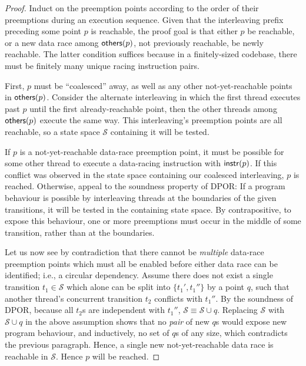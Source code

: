 \begin{proof}
Induct on the preemption points according to the order of their preemptions during an execution sequence.
Given that the interleaving prefix preceding some point $p$ is reachable,
the proof goal is that either $p$ be reachable,
or a new data race among $\mathsf{others}(p)$, not previously reachable, be newly reachable.
The latter condition suffices because in a finitely-sized codebase,
there must be finitely many unique racing instruction pairs.

First, $p$ must be ``coalesced'' away, as well as any other not-yet-reachable points in $\mathsf{others}(p)$.
Consider the alternate interleaving in which the first thread executes past $p$ until the first already-reachable point,
then the other threads among $\mathsf{others}(p)$ execute the same way.
This interleaving's preemption points are all reachable,
so a state space $\mathcal{S}$ containing it will be tested.

If $p$ is a not-yet-reachable data-race preemption point,
it must be possible for some other thread to execute a data-racing instruction with $\mathsf{instr}(p)$.
If this conflict was observed in the state space containing our coalesced interleaving, $p$ is reached.
Otherwise, appeal to the soundness property of DPOR:
If a program behaviour is possible by interleaving threads at the boundaries of the given transitions,
it will be tested in the containing state space.
By contrapositive, to expose this behaviour,
one or more preemptions must occur in the middle of some transition, rather than at the boundaries.

Let us now see by contradiction that there cannot be {\em multiple} data-race preemption points
which must all be enabled before either data race can be identified;
i.e., a circular dependency.
Assume there does not exist a single transition $t_1 \in \mathcal{S}$
which alone can be split into $\{t_1',t_1''\}$ by a point $q$,
such that another thread's concurrent transition $t_2$ conflicts with $t_1''$.
By the soundness of DPOR, because all $t_2$s are independent with $t_1''$, $\mathcal{S} \equiv \mathcal{S} \cup q$.
Replacing $\mathcal{S}$ with $\mathcal{S} \cup q$ in the above assumption shows that no {\em pair} of new $q$s would expose new program behaviour, and inductively, no set of $q$s of any size, which contradicts the previous paragraph.
%
Hence, a single new not-yet-reachable data race is reachable in $\mathcal{S}$. Hence $p$ will be reached.
\end{proof}

